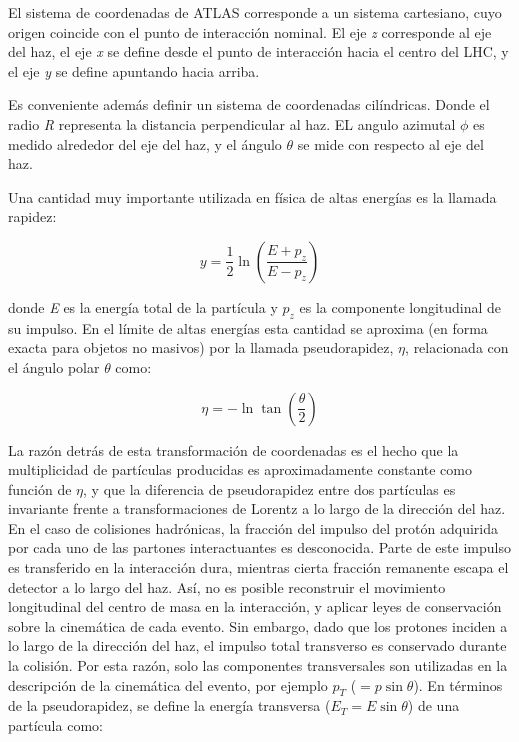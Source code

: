 El sistema de coordenadas de ATLAS corresponde a un sistema cartesiano, cuyo origen coincide con el punto de interacción nominal. El eje \textit{z} corresponde al eje del haz, el eje \textit{x} se define desde el punto de interacción hacia el centro del LHC, y el eje \textit{y} se define apuntando hacia arriba.

Es conveniente además definir un sistema de coordenadas cilíndricas. Donde el radio \textit{R} representa la distancia perpendicular al haz. EL angulo azimutal $\phi$ es medido alrededor del eje del haz, y el ángulo $\theta$ se mide con respecto al eje del haz. 

Una cantidad muy importante utilizada en física de altas energías es la llamada rapidez:

\begin{equation}
y=\frac{1}{2}\ln\left( \frac{E+p_{z}}{E-p_{z}}\right)
\end{equation}

donde \textit{E} es la energía total de la partícula y $p_{z}$ es la componente longitudinal de su impulso. En el límite de altas energías esta cantidad se aproxima (en forma exacta para objetos no masivos) por la llamada pseudorapidez, $\eta$, relacionada con el ángulo polar $\theta$ como:

\begin{equation}
\eta =-\ln \tan\left( \frac{\theta}{2} \right)
\end{equation}

La razón detrás de esta transformación de coordenadas es el hecho que la multiplicidad de partículas producidas es aproximadamente constante como función de $\eta$, y que la diferencia de pseudorapidez entre dos partículas es invariante frente a transformaciones de Lorentz a lo largo de la dirección del haz. En el caso de colisiones hadrónicas, la fracción del impulso del protón adquirida por cada uno de las partones interactuantes es desconocida. Parte de este impulso es transferido en la interacción dura, mientras cierta fracción remanente escapa el detector a lo largo del haz. Así, no es posible reconstruir el movimiento longitudinal del centro de masa en la interacción, y aplicar leyes de conservación sobre la cinemática de cada evento. Sin embargo, dado que los protones inciden a lo largo de la dirección del haz, el impulso total transverso es conservado durante la colisión. Por esta razón, solo las componentes transversales son utilizadas en la descripción de la cinemática del evento, por ejemplo $p_{T}$ ($=p\sin\theta$). En términos de la pseudorapidez, se define la energía transversa ($E_{T}=E\sin\theta$) de una partícula como:

